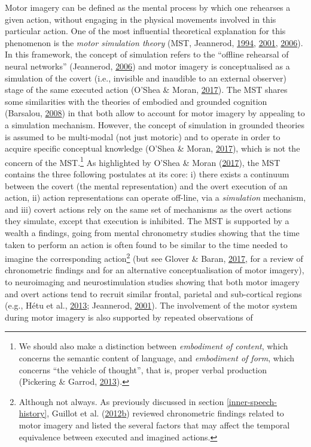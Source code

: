 \documentclass[a4paper,12pt,twoside,onecolumn,openright,final,oldfontcommands]{memoir}
\let\rmarkdownfootnote\footnote%
\def\footnote{\protect\rmarkdownfootnote}
\begin{document}
Motor imagery can be defined as the mental process by which one rehearses a given action, without engaging in the physical movements involved in this particular action. One of the most influential theoretical explanation for this phenomenon is the \emph{motor simulation theory} (MST, Jeannerod, \protect\hyperlink{ref-jeannerod_representing_1994}{1994}, \protect\hyperlink{ref-jeannerod_neural_2001}{2001}, \protect\hyperlink{ref-jeannerod_motor_2006}{2006}). In this framework, the concept of simulation refers to the \enquote{offline rehearsal of neural networks} (Jeannerod, \protect\hyperlink{ref-jeannerod_motor_2006}{2006}) and motor imagery is conceptualised as a simulation of the covert (i.e., invisible and inaudible to an external observer) stage of the same executed action (O'Shea \& Moran, \protect\hyperlink{ref-oshea_does_2017}{2017}). The MST shares some similarities with the theories of embodied and grounded cognition (Barsalou, \protect\hyperlink{ref-Barsalou2008}{2008}) in that both allow to account for motor imagery by appealing to a simulation mechanism. However, the concept of simulation in grounded theories is assumed to be multi-modal (not just motoric) and to operate in order to acquire specific conceptual knowledge (O'Shea \& Moran, \protect\hyperlink{ref-oshea_does_2017}{2017}), which is not the concern of the MST.\footnote{We should also make a distinction between \emph{embodiment of content}, which concerns the semantic content of language, and \emph{embodiment of form}, which concerns \enquote{the vehicle of thought}, that is, proper verbal production (Pickering \& Garrod, \protect\hyperlink{ref-pickering_integrated_2013}{2013}).} As highlighted by O'Shea \& Moran (\protect\hyperlink{ref-oshea_does_2017}{2017}), the MST contains the three following postulates at its core: i) there exists a continuum between the covert (the mental representation) and the overt execution of an action, ii) action representations can operate off-line, via a \emph{simulation} mechanism, and iii) covert actions rely on the same set of mechanisms as the overt actions they simulate, except that execution is inhibited. The MST is supported by a wealth a findings, going from mental chronometry studies showing that the time taken to perform an action is often found to be similar to the time needed to imagine the corresponding action\footnote{Although not always. As previously discussed in section \ref{inner-speech-history}, Guillot et al. (\protect\hyperlink{ref-guillot_understanding_2012}{2012}\protect\hyperlink{ref-guillot_understanding_2012}{b}) reviewed chronometric findings related to motor imagery and listed the several factors that may affect the temporal equivalence between executed and imagined actions.} (but see Glover \& Baran, \protect\hyperlink{ref-glover_motor-cognitive_2017}{2017}, for a review of chronometric findings and for an alternative conceptualisation of motor imagery), to neuroimaging and neurostimulation studies showing that both motor imagery and overt actions tend to recruit similar frontal, parietal and sub-cortical regions (e.g., Hétu et al., \protect\hyperlink{ref-hetu_neural_2013}{2013}; Jeannerod, \protect\hyperlink{ref-jeannerod_neural_2001}{2001}). The involvement of the motor system during motor imagery is also supported by repeated observations of 
\end{document}
